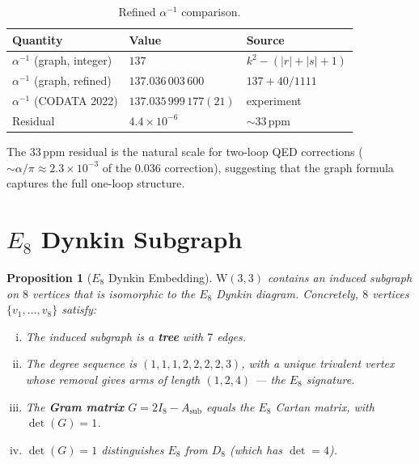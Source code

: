 \documentclass[12pt,a4paper]{article}
\newtheorem{proposition}[theorem]{Proposition}
\newcommand{\W}{\mathrm{W}(3,3)}
\begin{document}
\begin{table}[H]
\centering
\caption{Refined $\alpha^{-1}$ comparison.}
\label{tab:alpha-refined}
\renewcommand{\arraystretch}{1.3}
\begin{tabular}{@{}lll@{}}
\toprule
Quantity & Value & Source \\
\midrule
$\alpha^{-1}$ (graph, integer) & $137$ & $k^2 - (|r|+|s|+1)$ \\
$\alpha^{-1}$ (graph, refined) & $137.036\,003\,600$ & $137 + 40/1111$ \\
$\alpha^{-1}$ (CODATA 2022)    & $137.035\,999\,177(21)$ & experiment \\
\midrule
Residual & $4.4 \times 10^{-6}$ & $\sim 33\,$ppm \\
\bottomrule
\end{tabular}
\end{table}

\noindent
The 33\,ppm residual is the natural scale for two-loop QED
corrections ($\sim\alpha/\pi \approx 2.3 \times 10^{-3}$ of
the 0.036 correction), suggesting that the graph formula
captures the full one-loop structure.

\section{$E_8$ Dynkin Subgraph}
\label{sec:dynkin}

\begin{proposition}[$E_8$ Dynkin Embedding]\label{prop:dynkin}
$\W$ contains an induced subgraph on $8$ vertices that is
isomorphic to the $E_8$ Dynkin diagram.  Concretely, $8$ vertices
$\{v_1,\ldots,v_8\}$ satisfy:
\begin{enumerate}[(i)]
  \item The induced subgraph is a \textbf{tree} with $7$ edges.
  \item The degree sequence is $(1,1,1,2,2,2,2,3)$, with a unique
        trivalent vertex whose removal gives arms of length
        $(1,2,4)$ --- the $E_8$ signature.
  \item The \textbf{Gram matrix} $G = 2I_8 - A_{\mathrm{sub}}$
        equals the $E_8$ Cartan matrix, with
        $\det(G) = 1$.
  \item $\det(G) = 1$ distinguishes $E_8$ from $D_8$
        (which has $\det = 4$).
\end{enumerate}
\end{proposition}
\end{document}

